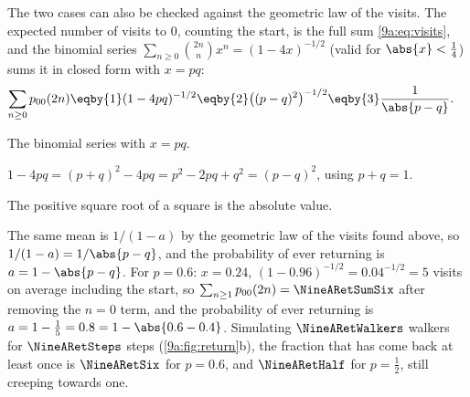 The two cases can also be checked against the geometric law of the visits. The expected number
of visits to 0, counting the start, is the full sum \eqref{9a:eq:visits}, and the binomial
series $\sum_{n\ge0}\binom{2n}{n}x^n=(1-4x)^{-1/2}$ (valid for $\abs{x}<\tfrac14$) sums it in
closed form with $x=pq$:
\begin{align*}
  \sum_{n\ge0}p_{00}(2n)
  &\eqby{1}(1-4pq)^{-1/2}
   \eqby{2}\bigl((p-q)^2\bigr)^{-1/2}
   \eqby{3}\frac{1}{\abs{p-q}}.
\end{align*}
\begin{explain}
  \item The binomial series with $x=pq$.
  \item $1-4pq=(p+q)^2-4pq=p^2-2pq+q^2=(p-q)^2$, using $p+q=1$.
  \item The positive square root of a square is the absolute value.
\end{explain}
The same mean is $1/(1-a)$ by the geometric law of the visits found above, so
$1/(1-a)=1/\abs{p-q}$, and the probability of ever returning is $a=1-\abs{p-q}$.
For $p=0.6$: $x=0.24$, $(1-0.96)^{-1/2}=0.04^{-1/2}=5$ visits on average including the start,
so $\sum_{n\ge1}p_{00}(2n)=\NineARetSumSix$ after removing the $n=0$ term, and the probability of
ever returning is $a=1-\tfrac15=0.8=1-\abs{0.6-0.4}$. Simulating $\NineARetWalkers$ walkers for
$\NineARetSteps$ steps (\cref{9a:fig:return}b), the fraction that has come back at least once is
$\NineARetSix$ for $p=0.6$, and $\NineARetHalf$ for $p=\tfrac12$, still creeping towards one.

